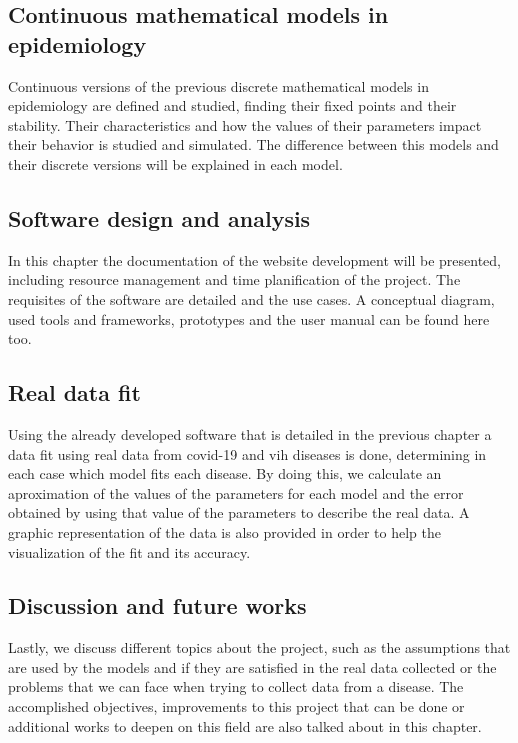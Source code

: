 \subsection*{Continuous mathematical models in epidemiology}

Continuous versions of the previous discrete mathematical models in epidemiology are defined and studied, finding their fixed points and their stability. Their characteristics and how the values of their parameters impact their behavior is studied and simulated. The difference between this models and their discrete versions will be explained in each model.

\subsection*{Software design and analysis}

In this chapter the documentation of the website development will be presented, including resource management and time planification of the project. The requisites of the software are detailed and the use cases. A conceptual diagram, used tools and frameworks, prototypes and the user manual can be found here too.

\subsection*{Real data fit}

Using the already developed software that is detailed in the previous chapter a data fit using real data from covid-19 and vih diseases is done, determining in each case which model fits each disease. By doing this, we calculate an aproximation of the values of the parameters for each model and the error obtained by using that value of the parameters to describe the real data. A graphic representation of the data is also provided in order to help the visualization of the fit and its accuracy.

\subsection*{Discussion and future works}

Lastly, we discuss different topics about the project, such as the assumptions that are used by the models and if they are satisfied in the real data collected or the problems that we can face when trying to collect data from a disease. The accomplished objectives, improvements to this project that can be done or additional works to deepen on this field are also talked about in this chapter.